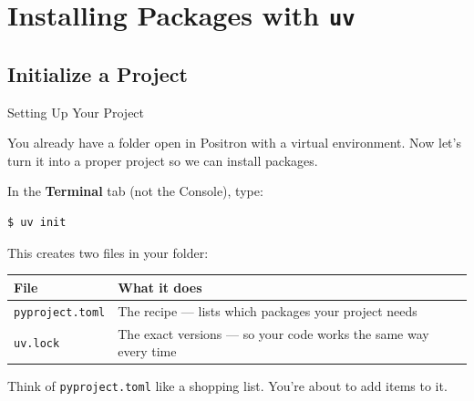 \documentclass[9pt,aspectratio=169]{beamer}
\begin{document}
\section{Installing Packages with \texttt{uv}}
\subsection{Initialize a Project}

\begin{frame}[fragile]{Setting Up Your Project}

You already have a folder open in Positron with a virtual environment. Now let's turn it into a proper \alert{project} so we can install packages.

\bigskip

In the \textbf{Terminal} tab (not the Console), type:

\begin{lstlisting}[style=shell]
$ uv init
\end{lstlisting}

\medskip

This creates two files in your folder:

\medskip

\begin{tabular}{@{}lp{8cm}@{}}
\toprule
\textbf{File} & \textbf{What it does} \\
\midrule
\texttt{pyproject.toml} & The recipe --- lists which packages your project needs \\[0.3em]
\texttt{uv.lock} & The exact versions --- so your code works the same way every time \\
\bottomrule
\end{tabular}

\bigskip

Think of \texttt{pyproject.toml} like a shopping list. You're about to add items to it.

\end{frame}
\end{document}
